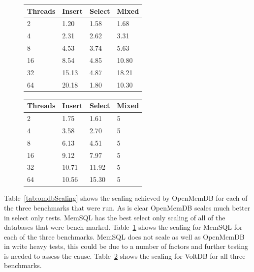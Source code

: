 \documentclass[conference, compsoc]{IEEEtran}
\begin{document}
\par\vspace{\baselineskip}
\begin{figure}[H]
\begin{center}
 \label{tab:memsqlScaling}
  \begin{tabular}{  l  l  l  l }
    \midrule
    \bf Threads & \bf Insert & \bf Select & \bf Mixed \\ \midrule
     2 & 1.20 & 1.58 & 1.68 \\ \midrule
     4 & 2.31 & 2.62 & 3.31 \\ \midrule
     8 & 4.53 & 3.74 & 5.63 \\ \midrule
     16 & 8.54 & 4.85 & 10.80 \\ \midrule
     32 & 15.13 & 4.87 & 18.21 \\ \midrule
     64 & 20.18 & 1.80 & 10.30 \\ \midrule
  \end{tabular}
\end{center}
\end{figure}

\par\vspace{\baselineskip}
\begin{figure}[H]
\begin{center}
 \label{tab:voltScaling}
  \begin{tabular}{  l  l  l  l }
    \midrule
    \bf Threads & \bf Insert & \bf Select & \bf Mixed \\ \midrule
     2 & 1.75 & 1.61 & 5 \\ \midrule
     4 & 3.58 & 2.70 & 5 \\ \midrule
     8 & 6.13 & 4.51 & 5 \\ \midrule
     16 & 9.12 & 7.97 & 5 \\ \midrule
     32 & 10.71 & 11.92 & 5 \\ \midrule
     64 & 10.56 & 15.30 & 5 \\ \midrule
  \end{tabular}
\end{center}
\end{figure}


Table~\ref{tab:omdbScaling} shows the scaling achieved by OpenMemDB for each of the three
benchmarks that were run. As is clear OpenMemDB scales much better in select only tests. 
MemSQL has the best select only scaling of all of the databases that were bench-marked.  
Table~\ref{tab:memsqlScaling} shows the scaling for MemSQL for each of the three benchmarks. 
MemSQL does not scale as well as OpenMemDB in write heavy tests, this could be due to a number of factors
and further testing is needed to assess the cause.
Table~\ref{tab:voltScaling} shows the scaling for VoltDB for all three benchmarks.
\end{document}
